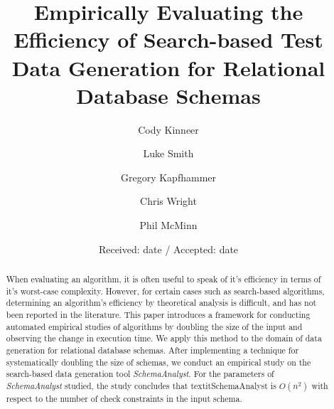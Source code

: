 \documentclass[smallextended]{svjour3}       %
\begin{document}
\title{Empirically Evaluating the Efficiency of Search-based Test Data
Generation for Relational Database Schemas}



\author{Cody Kinneer         \and
        Luke Smith \and
        Gregory Kapfhammer \and
        Chris Wright \and
        Phil McMinn
}



\date{Received: date / Accepted: date}


\maketitle

\begin{abstract}
When evaluating an algorithm, it is often useful to speak of it's
efficiency in terms of it's worst-case complexity.  However, for certain
cases such as search-based algorithms, determining an algorithm's
efficiency by theoretical analysis is difficult, and has not been
reported in the literature. This paper introduces a
framework for conducting automated empirical studies of algorithms by
doubling the size of the input and observing the change in execution
time. We apply this method to the domain of data generation for
relational database schemas.  After implementing a technique for 
systematically doubling the size of schemas, we conduct an
empirical study on the search-based data generation tool
\textit{SchemaAnalyst}. For the parameters of \textit{SchemaAnalyst}
studied, the study concludes that textit{SchemaAnalyst} is $O(n^2)$
with respect to the number of check constraints in the input schema.


\end{abstract}
\end{document}
